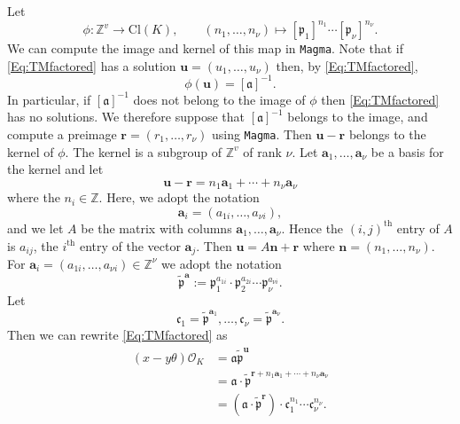 Let 
\[\phi : \mathbb{Z}^v \rightarrow \text{Cl}(K), \qquad (n_1,\dots ,n_{\nu}) \mapsto [\mathfrak{p}_1]^{n_1}\cdots [\mathfrak{p}_{\nu}]^{n_{\nu}}.\]
We can compute the image and kernel of this map in \texttt{Magma}. Note that if \eqref{Eq:TMfactored} has a solution $\mathbf{u}=(u_1,\dots, u_{\nu})$ then, by \eqref{Eq:TMfactored},
\[\phi(\mathbf{u})=[\mathfrak{a}]^{-1}.\]
In particular, if $[\mathfrak{a}]^{-1}$ does not belong to the image of $\phi$ then \eqref{Eq:TMfactored} has no solutions. We therefore suppose that $[\mathfrak{a}]^{-1}$ belongs to the image, and compute a preimage $\mathbf{r}=(r_1,\dotsc,r_{\nu})$ using \texttt{Magma}. Then $\mathbf{u}-\mathbf{r}$ belongs to the kernel of $\phi$. The kernel is a subgroup of $\mathbb{Z}^v$ of rank $\nu$. Let $\mathbf{a}_1,\dots,\mathbf{a}_{\nu}$ be a basis for the kernel and let 
\[\mathbf{u}-\mathbf{r}=n_1 \mathbf{a}_1+\cdots + n_{\nu} \mathbf{a}_{\nu}\]
where the $n_i \in \mathbb{Z}$. Here, we adopt the notation
\[\mathbf{a}_i = (a_{1i}, \dots, a_{\nu i}),\]
and we let $A$ be the matrix with columns $\mathbf{a}_1,\dots,\mathbf{a}_{\nu}$. Hence the $(i,j)^{\text{th}}$ entry of $A$ is $a_{ij}$, the $i^{\text{th}}$ entry of the vector $\mathbf{a}_j$. Then $\mathbf{u}= A\mathbf{n}+\mathbf{r}$ where $\mathbf{n} = (n_1,\dots,n_{\nu})$.
For $\mathbf{a}_i=(a_{1i},\dotsc,a_{\nu i}) \in \mathbb{Z}^{\nu}$ we adopt the notation 
\[\tilde{\mathfrak{p}}^\mathbf{a} :=\mathfrak{p}_1^{a_{1i}}\cdot \mathfrak{p}_2^{a_{2i}} \cdots \mathfrak{p}_{\nu}^{a_{\nu i}}.\]
Let
\[\mathfrak{c}_1= \tilde{\mathfrak{p}}^{\mathbf{a}_1},\dotsc,\mathfrak{c}_{\nu}= \tilde{\mathfrak{p}}^{\mathbf{a}_{\nu}}.\]
Then we can rewrite \eqref{Eq:TMfactored} as
\[\begin{array}{ll}
(x-y\theta) \mathcal{O}_K 
	& = \mathfrak{a} \tilde{\mathfrak{p}}^{\mathbf{u}}\\ 
	& = \mathfrak{a} \cdot \tilde{\mathfrak{p}}^{\mathbf{r} + n_1 \mathbf{a}_1 + \cdots + n_{\nu} \mathbf{a}_{\nu}}\\
	& = (\mathfrak{a} \cdot \tilde{\mathfrak{p}}^\mathbf{r}) \cdot \mathfrak{c}_1^{n_1}\cdots \mathfrak{c}_{\nu}^{n_{\nu}}.
\end{array}\]

